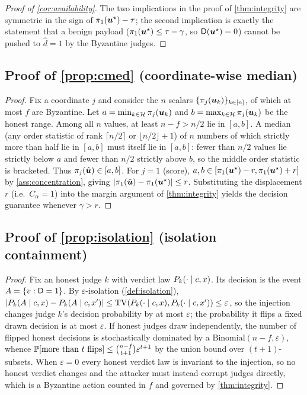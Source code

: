 \begin{proof}[Proof of \cref{cor:availability}]
The two implications in the proof of \cref{thm:integrity} are symmetric in the sign of
$\pi_1(\bm{u}^{\star})-\tau$; the second implication is exactly the statement that a benign payload
($\pi_1(\bm{u}^{\star})\le\tau-\gamma$, so $\mathsf{D}(\bm{u}^{\star})=0$) cannot be pushed to $\hat d=1$ by the
Byzantine judges. \qedhere
\end{proof}

\subsection{Proof of \cref{prop:cmed} (coordinate-wise median)}
\begin{proof}
Fix a coordinate $j$ and consider the $n$ scalars $\{\pi_j(\bm{u}_k)\}_{k\in[n]}$, of which
at most $f$ are Byzantine. Let $a=\min_{k\in\mathcal{H}}\pi_j(\bm{u}_k)$ and
$b=\max_{k\in\mathcal{H}}\pi_j(\bm{u}_k)$ be the honest range. Among all $n$ values, at least
$n-f>n/2$ lie in $[a,b]$. A median (any order statistic of rank $\lceil n/2\rceil$ or
$\lfloor n/2\rfloor+1$) of $n$ numbers of which strictly more than half lie in $[a,b]$ must
itself lie in $[a,b]$: fewer than $n/2$ values lie strictly below $a$ and fewer than $n/2$
strictly above $b$, so the middle order statistic is bracketed. Thus
$\pi_j(\hat{\bm{u}})\in[a,b]$. For $j=1$ (score), $a,b\in[\pi_1(\bm{u}^{\star})-r,\pi_1(\bm{u}^{\star})+r]$ by
\cref{ass:concentration}, giving $|\pi_1(\hat{\bm{u}})-\pi_1(\bm{u}^{\star})|\le r$. Substituting the
displacement $r$ (i.e.\ $C_\alpha=1$) into the margin argument of \cref{thm:integrity}
yields the decision guarantee whenever $\gamma>r$. \qedhere
\end{proof}

\subsection{Proof of \cref{prop:isolation} (isolation containment)}
\begin{proof}
Fix an honest judge $k$ with verdict law $P_k(\cdot\mid c,x)$. Its decision is the event
$A=\{v:\mathsf{D}=1\}$. By $\varepsilon$-isolation (\cref{def:isolation}),
$|P_k(A\mid c,x)-P_k(A\mid c,x')|\le\operatorname{TV}(P_k(\cdot\mid c,x),
P_k(\cdot\mid c,x'))\le\varepsilon$, so the injection changes judge $k$'s decision
probability by at most $\varepsilon$; the probability it flips a fixed drawn decision is at
most $\varepsilon$. If honest judges draw independently, the number of flipped honest
decisions is stochastically dominated by a $\mathrm{Binomial}(n-f,\varepsilon)$, whence
$\mathbb{P}[\text{more than }t\text{ flips}]\le\binom{n-f}{t+1}\varepsilon^{t+1}$ by the union
bound over $(t{+}1)$-subsets. When $\varepsilon=0$ every honest verdict law is invariant to
the injection, so no honest verdict changes and the attacker must instead corrupt judges
directly, which is a Byzantine action counted in $f$ and governed by \cref{thm:integrity}.
\qedhere
\end{proof}

